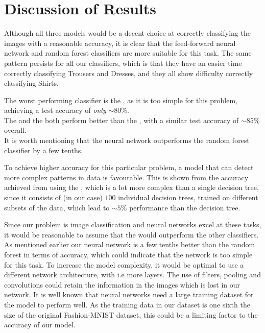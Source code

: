 \section{Discussion of Results}
Although all three models would be a decent choice at correctly classifying the images with a reasonable accuracy, it is clear that the feed-forward neural network and random forest classifiers are more suitable for this task.
The same pattern persists for all our classifiers, which is that they have an easier time correctly classifying Trousers and Dresses, and they all show difficulty correctly classifying Shirts.

The worst performing classifier is the , as it is too simple for this problem, achieving a test accuracy of \textit{only} $\sim80\%$.
\\
The  and the  both perform better than the , with a similar test accuracy of $\sim85\%$ overall.\\
It is worth mentioning that the neural network outperforms the random forest classifier by a few tenths.

To achieve higher accuracy for this particular problem, a model that can detect more complex patterns in data is favourable.
This is shown from the accuracy achieved from using the , which is a lot more complex than a single decision tree,
since it consists of (in our case) $100$ individual decision trees, trained on different subsets of the data, which lead to $\sim5\%$ performance than the decision tree.

Since our problem is image classification and neural networks excel at these tasks, it would be reasonable to assume that the  would outperform the other classifiers.
As mentioned earlier our neural network is a few tenths better than the random forest in terms of accuracy, which could indicate that the network is too simple for this task.
To increase the model complexity, it would be optimal to use a different network architecture, with i.e more layers.
The use of filters, pooling and convolutions could retain the information in the images which is lost in our network.
It is well known that neural networks need a large training dataset for the model to perform well.
As the training data in our dataset is one sixth the size of the original Fashion-MNIST dataset, this could be a limiting factor to the accuracy of our model.

